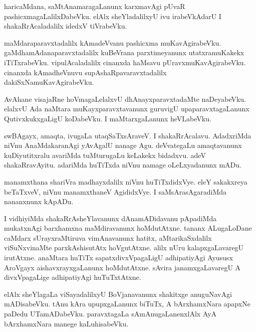 \documentclass{article}
\begin{document}
\begin{mn}
haricaMdana,  saMtAnamaragaLanunx  karxmavAgi  pUvaR  pashicxmagaLalilxDabeVku.  elAlx  
sheYladalilxyU  ivu  irabeVkAdarU  I  shakaRrAcaladalilx  idedxV  tiVrabeVku.
\end{mn}

\begin{mn}
maMdaraparavxtadalilx  kAmadeVvanu  pashicxma muKavAgirabeVku.  gaMdhamAdanaparavxtadalilx  
kuBeVrana  parxtimeyanunx  utatxramuKakekx  iTiTxrabeVku.  vipulAcaladalilx  cinanxda  haMsavu  
pUravxmuKavAgirabeVku.  cinanxda  kAmadheVnuvu  supAshaRpavaravxtadalilx  dakiSxNamuKavAgirabeVku.
\end{mn}

\begin{mn}
AvAhane  visajaRne  hoVmagaLelalxvU  dhAnayxparavxtadaMte  naDeyabeVku.  elalxvU  Ada  
naMtara  muKayxparavxtavanunx  guruvigU  upaparavxtagaLanunx  QutivxkukxgaLigU  
koDabeVku.  I  maMtarxgaLanunx  heVLabeVku.
\end{mn}

\begin{mn}
swBAgayx,  amaqta,  ivugaLa  utaqSaTxsAraveV.  I  shakaRrAcalavu.  AdadxriMda  niVnu  AnaMdakaranAgi  
yAvAgalU  nanage  Agu.  deVvategaLu  amaqtavanunx  kuDiyutitxralu  avariMda  tuMturugaLu  keLakekx  
bidadxvu.  adeV  shakaRravAyitu.  adariMda  huTiTxda  niVnu  namage  oLeLxyadanunx  mADu.
\end{mn}

\begin{mn}
manamxthana  shariVra madhayxdalilx  niVnu  huTiTxdidxVye.  eleY  sakakxreya  beTaTxveV,  niVnu  
manamxthaneV  AgididxVye.  I  saMsArasAgaradiMda  nananxnunx  kApADu.
\end{mn}

\begin{mn}
I  vidhiyiMda  shakaRrAsheYlavanunx  dAnamADidavanu  pApadiMda  mukatxnAgi  barxhamxna  
maMdiravanunx  hoMdutAtxne.  tananx  ALugaLoDane  caMdarx sUrayxraMtiruva  vimAnavanunx  
hatitx,  aMtarikaSxdalilx  viSuNxvinaMte  parxkAshisutAtx  hoVgutAtxne.  alilx  nUru  
kalapxgaLavaregU  irutAtxne.  anaMtara  huTiTx  sapatxdivxVpagaLigU  adhipatiyAgi  
Ayususx  AroVgayx  aishavxrayxgaLanunx  hoMdutAtxne.  sAvira  janamxgaLavaregU  A  
divxVpagaLige  adhipatiyAgi  huTuTxtAtxne.
\end{mn}

\begin{mn}
elAlx  sheYlagaLa  viSayadalilxyU  BoVjanavanunx  shakitxge  anuguNavAgi  mADisabeVku.  
tAnu  kAra  upupxgaLanunx  biTuTx,  A  bArxhamxNara  apapxNe  paDedu  UTamADabeVku.  
paravxtagaLa  sAmAnugaLanenxlAlx  AyA bArxhamxNara  manege  kaLuhisabeVku.
\end{mn}
\end{document}
